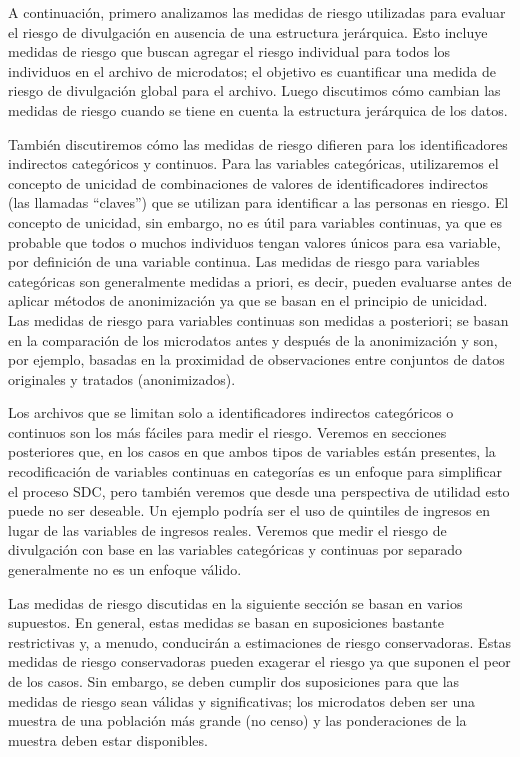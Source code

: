 \documentclass[]{book}
\theoremstyle{definition}
\theoremstyle{definition}
\theoremstyle{definition}
\theoremstyle{definition}
\theoremstyle{remark}
\begin{document}
A continuación, primero analizamos las medidas de riesgo utilizadas para evaluar el riesgo de divulgación en ausencia de una estructura jerárquica. Esto incluye medidas de riesgo que buscan agregar el riesgo individual para todos los individuos en el archivo de microdatos; el objetivo es cuantificar una medida de riesgo de divulgación global para el archivo. Luego discutimos cómo cambian las medidas de riesgo cuando se tiene en cuenta la estructura jerárquica de los datos.

También discutiremos cómo las medidas de riesgo difieren para los identificadores indirectos categóricos y continuos. Para las variables categóricas, utilizaremos el concepto de unicidad de combinaciones de valores de identificadores indirectos (las llamadas ``claves'') que se utilizan para identificar a las personas en riesgo. El concepto de unicidad, sin embargo, no es útil para variables continuas, ya que es probable que todos o muchos individuos tengan valores únicos para esa variable, por definición de una variable continua. Las medidas de riesgo para variables categóricas son generalmente medidas a priori, es decir, pueden evaluarse antes de aplicar métodos de anonimización ya que se basan en el principio de unicidad. Las medidas de riesgo para variables continuas son medidas a posteriori; se basan en la comparación de los microdatos antes y después de la anonimización y son, por ejemplo, basadas en la proximidad de observaciones entre conjuntos de datos originales y tratados (anonimizados).

Los archivos que se limitan solo a identificadores indirectos categóricos o continuos son los más fáciles para medir el riesgo. Veremos en secciones posteriores que, en los casos en que ambos tipos de variables están presentes, la recodificación de variables continuas en categorías es un enfoque para simplificar el proceso SDC, pero también veremos que desde una perspectiva de utilidad esto puede no ser deseable. Un ejemplo podría ser el uso de quintiles de ingresos en lugar de las variables de ingresos reales. Veremos que medir el riesgo de divulgación con base en las variables categóricas y continuas por separado generalmente no es un enfoque válido.

Las medidas de riesgo discutidas en la siguiente sección se basan en varios supuestos. En general, estas medidas se basan en suposiciones bastante restrictivas y, a menudo, conducirán a estimaciones de riesgo conservadoras. Estas medidas de riesgo conservadoras pueden exagerar el riesgo ya que suponen el peor de los casos. Sin embargo, se deben cumplir dos suposiciones para que las medidas de riesgo sean válidas y significativas; los microdatos deben ser una muestra de una población más grande (no censo) y las ponderaciones de la muestra deben estar disponibles.
\end{document}
